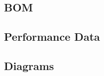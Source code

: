 \documentclass[../jb_user_manual.tex]{subfiles}
\begin{document}
\subsection{BOM}
\subsection{Performance Data}
\subsection{Diagrams}
\end{document}
